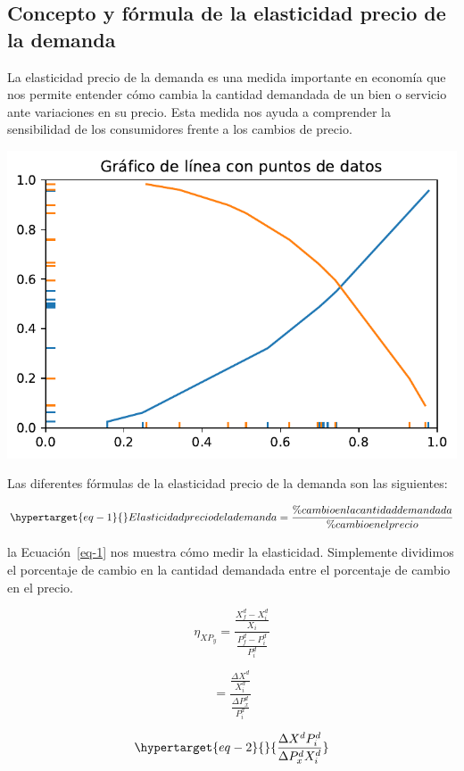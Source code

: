 \documentclass[
  a4paper,
]{article}
\begin{document}
\hypertarget{concepto-y-fuxf3rmula-de-la-elasticidad-precio-de-la-demanda}{%
\subsection{Concepto y fórmula de la elasticidad precio de la
demanda}\label{concepto-y-fuxf3rmula-de-la-elasticidad-precio-de-la-demanda}}

La elasticidad precio de la demanda es una medida importante en economía
que nos permite entender cómo cambia la cantidad demandada de un bien o
servicio ante variaciones en su precio. Esta medida nos ayuda a
comprender la sensibilidad de los consumidores frente a los cambios de
precio.

\includegraphics{index_files/figure-pdf/cell-2-output-1.pdf}

Las diferentes fórmulas de la elasticidad precio de la demanda son las
siguientes:

\begin{equation}\protect\hypertarget{eq-1}{}{
Elasticidad precio de la demanda =\frac{\% cambio en la cantidad demandada}{\% cambio en el precio}
}\label{eq-1}\end{equation}

la Ecuación~\ref{eq-1} nos muestra cómo medir la elasticidad.
Simplemente dividimos el porcentaje de cambio en la cantidad demandada
entre el porcentaje de cambio en el precio.

\[
\eta _{XP_y} = \frac{\frac {X_f^d - X_i^d}{X_i}}{\frac {P_f^d - P_i^d}{P_i^d}}
\]

\[
= \frac{\frac{\Delta X^d}{X_i^d}}{\frac{\Delta P_x^d}{P_i^d}}
\]

\begin{equation}\protect\hypertarget{eq-2}{}{
\frac{\Delta X^d P_i^d}{\Delta P_x^d X_i^d}
}\label{eq-2}\end{equation}
\end{document}
